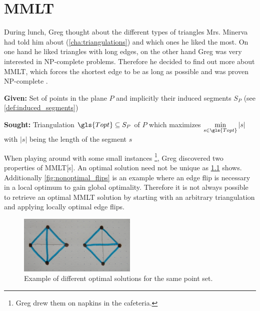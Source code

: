 \chapter{\texorpdfstring{\glsdesc{MMLT}}{MMLT}}\label{cha:mmlt}
During lunch, Greg thought about the different types of triangles
Mrs. Minerva had told him about (\cref{cha:triangulations}) and which ones
he liked the most. On one hand he liked triangles with long edges,
on the other hand Greg was very interested in NP-complete problems.
Therefore he decided to find out more about \gls{MMLT}, which forces
the shortest edge to be as long as possible and was proven 
NP-complete \cite{mmlt_complexity}.

\begin{problem}
  \hfill
  \begin{labeling}{\hspace{4em}}
    \item[\textbf{Given:}]
      Set of points in the plane \(P\) and implicitly their induced segments
      \(S_P\) (see \cref{def:induced_segments})
    \item[\textbf{Sought:}]
      Triangulation \(\gls{Topt}\subseteq S_P\) of \(P\) which maximizes
      \(\min\limits_{s\in \gls{Topt}} |s|\) 
      with \(|s|\) being the length of the segment \(s\)
  \end{labeling}
\end{problem}

When playing around with some small instances \footnote{Greg drew them
on napkins in the cafeteria.}, Greg discovered two 
properties of \gls{MMLT}[s]. An optimal solution need not be unique as
\cref{fig:non_unique_optimal} shows. Additionally 
\cref{fig:nonoptimal_flips} is an example where an edge flip
 is necessary in a local optimum to gain 
global optimality. Therefore it is not always possible to retrieve an
optimal \gls{MMLT} solution by starting with an arbitrary
triangulation and applying locally optimal edge flips.

\begin{figure}[ht]
  \centering
  \includegraphics[width=0.5\textwidth]{img/non_unique_optimal.jpg}
  \caption{Example of different optimal solutions for the same point set.\label{fig:non_unique_optimal}}
\end{figure}

